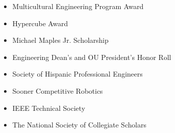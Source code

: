 \documentclass[10pt,letterpaper]{article}
\begin{document}
	\begin{minipage}[t]{0.53\textwidth}
          \begin{flushleft}
            \begin{itemize}
              \setlength\itemsep{-0.10em}
            \item Multicultural Engineering Program Award
            \item Hypercube Award
            \item Michael Maples Jr. Scholarship
            \item Engineering Dean’s and OU President’s Honor Roll
            \end{itemize}
          \end{flushleft}
	\end{minipage}
	\begin{minipage}[t]{0.44\textwidth}
          \begin{flushright}
            \begin{flushleft}
              \begin{itemize}
                \setlength\itemsep{-0.10em}
              \item Society of Hispanic Professional Engineers
              \item Sooner Competitive Robotics
              \item IEEE Technical Society
              \item The National Society of Collegiate Scholars
              \end{itemize}
            \end{flushleft}
          \end{flushright}
        \end{minipage}
      
\end{document}
